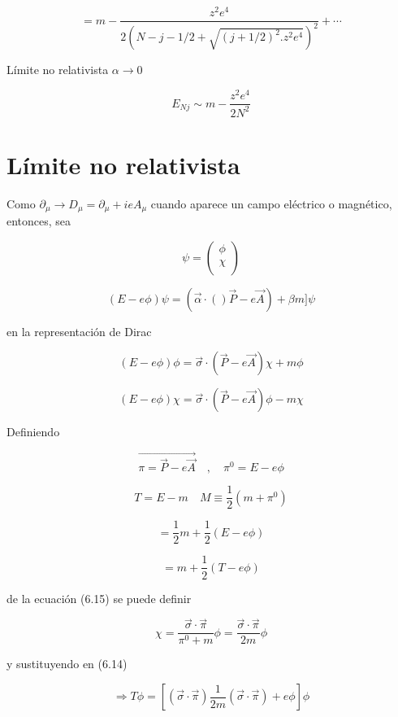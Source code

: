 \documentclass{report}
\begin{document}
\[= m - \frac{z^2 e^4}{2(N-j-1/2 + \sqrt{(j+1/2)^2 . z^2 e^4})^2 }+ \cdots  \]

Límite no relativista $\alpha \rightarrow 0 $

\[E _{Nj} \sim m - \frac{z^2 e^4 }{2N^2} \]


\section{Límite no relativista}

Como $\partial_{\mu} \rightarrow D_{\mu} = \partial_{\mu} + ie A_{\mu}$ cuando aparece un campo eléctrico o magnético, entonces, sea

\[\psi = \left ( \begin{array}{cc}
 \phi   \\
 \chi   \\
 \end{array} \right) \]

\[(E-e\phi)\psi = (\overrightarrow{\alpha} \cdot ()\overrightarrow{P}-e\overrightarrow{A})+ \beta m ] \psi \]

en la representación de Dirac

\begin{equation}
(E-e\phi) \phi = \overrightarrow{\sigma} \cdot (\overrightarrow{P} - e\overrightarrow{A})\chi + m \phi
\end{equation}

\begin{equation}
(E-e \phi) \chi = \overrightarrow{ \sigma} \cdot ( \overrightarrow{P} - e \overrightarrow{A}) \phi - m \chi
\end{equation}

Definiendo 

\[\overrightarrow{\pi = \overrightarrow{P}-e\overrightarrow{A}} \quad , \quad \pi^{0}= E-e \phi \]

\[ T= E-m \quad M \equiv \frac{1}{2} (m+\pi ^0)\]

\[= \frac{1}{2}m + \frac{1}{2} (E-e \phi )\]

\[= m + \frac{1}{2} (T-e\phi )\]

de la ecuación (6.15) se puede definir

\[\chi = \frac{\overrightarrow{\sigma} \cdot \overrightarrow{\pi}}{\pi ^{0} + m} \phi = \frac{\overrightarrow{\sigma} \cdot \overrightarrow{\pi }}{2m} \phi\]

y sustituyendo en (6.14)

\[\Rightarrow T \phi = [(\overrightarrow{\sigma} \cdot \overrightarrow{\pi}) \frac{1}{2m} (\overrightarrow{\sigma}\cdot \overrightarrow{\pi}) + e \phi ] \phi \]
\end{document}
